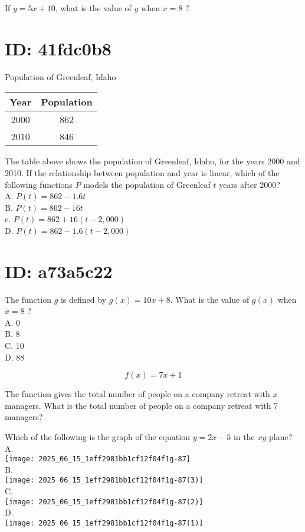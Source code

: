If $y=5 x+10$, what is the value of $y$ when $x=8$ ?

\section*{ID: 41fdc0b8}
Population of Greenleaf, Idaho

\begin{center}
\begin{tabular}{|c|c|}
\hline
Year & Population \\
\hline
2000 & 862 \\
\hline
2010 & 846 \\
\hline
\end{tabular}
\end{center}

The table above shows the population of Greenleaf, Idaho, for the years 2000 and 2010. If the relationship between population and year is linear, which of the following functions $P$ models the population of Greenleaf $t$ years after 2000?\\
A. $P(t)=862-1.6 t$\\
B. $P(t)=862-16 t$\\
c. $P(t)=862+16(t-2,000)$\\
D. $P(t)=862-1.6(t-2,000)$

\section*{ID: a73a5c22}
The function $g$ is defined by $g(x)=10 x+8$. What is the value of $g(x)$ when $x=8$ ?\\
A. 0\\
B. 8\\
C. 10\\
D. 88

$$
f(x)=7 x+1
$$

The function gives the total number of people on a company retreat with $x$ managers. What is the total number of people on a company retreat with 7 managers?

Which of the following is the graph of the equation $y=2 x-5$ in the $x y$-plane?\\
A.\\
\texttt{[image: 2025\_06\_15\_1eff2981bb1cf12f04f1g-87]}\\
B.\\
\texttt{[image: 2025\_06\_15\_1eff2981bb1cf12f04f1g-87(3)]}\\
C.\\
\texttt{[image: 2025\_06\_15\_1eff2981bb1cf12f04f1g-87(2)]}\\
D.\\
\texttt{[image: 2025\_06\_15\_1eff2981bb1cf12f04f1g-87(1)]}


